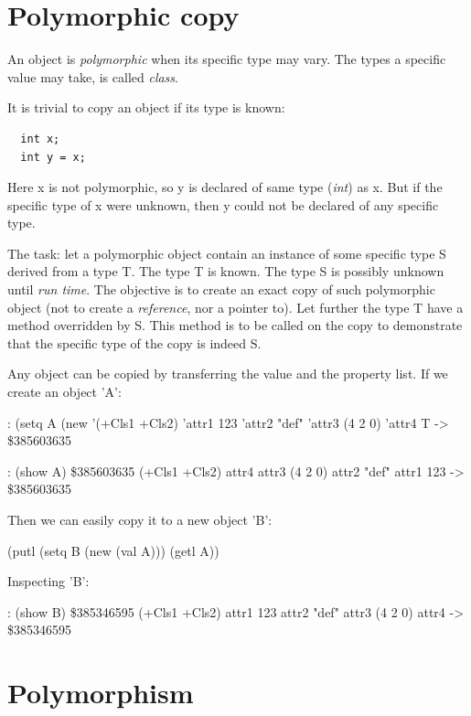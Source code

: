 \pagebreak{}
\section*{Polymorphic copy}


An object is \emph{polymorphic} when its specific
type may vary. The types a specific value may take, is called
\emph{class}.

It is trivial to copy an object if its type is known:

\begin{verbatim}
  int x;
  int y = x;
\end{verbatim}

Here x is not polymorphic, so y is declared of same type (\emph{int}) as
x. But if the specific type of x were unknown, then y could not be
declared of any specific type.

The task: let a polymorphic object contain an instance of some specific
type S derived from a type T. The type T is known. The type S is
possibly unknown until \emph{run time}. The objective
is to create an exact copy of such polymorphic object (not to create a
\emph{reference}, nor a pointer to). Let further the
type T have a method overridden by S. This method is to be called on the
copy to demonstrate that the specific type of the copy is indeed S.

\begin{wideverbatim}

Any object can be copied by transferring the value and the property list. If we
create an object 'A':

: (setq A (new '(+Cls1 +Cls2) 'attr1 123  'attr2 "def"  'attr3 (4 2 0)  'attr4 T
-> \$385603635

: (show A)
\$385603635 (+Cls1 +Cls2)
   attr4
   attr3 (4 2 0)
   attr2 "def"
   attr1 123
-> \$385603635

Then we can easily copy it to a new object 'B':

(putl (setq B (new (val A))) (getl A))

Inspecting 'B':

: (show B)
\$385346595 (+Cls1 +Cls2)
   attr1 123
   attr2 "def"
   attr3 (4 2 0)
   attr4
-> \$385346595

\end{wideverbatim}

\pagebreak{}
\section*{Polymorphism}

